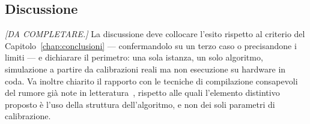 \begin{onehalfspace}
\section{Discussione}
\label{sec:discussione_layout}

\emph{[DA COMPLETARE.]} La discussione deve collocare l'esito rispetto al criterio del Capitolo~\ref{chap:conclusioni} --- confermandolo su un terzo caso o precisandone i limiti --- e dichiarare il perimetro: una sola istanza, un solo algoritmo, simulazione a partire da calibrazioni reali ma non esecuzione su hardware in coda. Va inoltre chiarito il rapporto con le tecniche di compilazione consapevoli del rumore già note in letteratura~\cite{murali2019, tannu2019}, rispetto alle quali l'elemento distintivo proposto è l'uso della struttura dell'algoritmo, e non dei soli parametri di calibrazione.

\end{onehalfspace}

